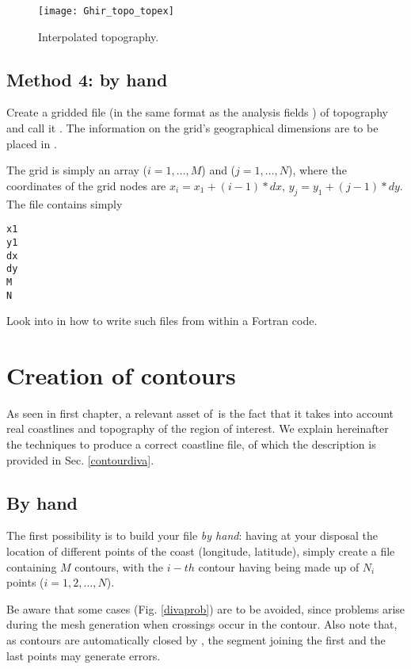 \begin{figure}[htpb]
\centering
\texttt{[image: Ghir\_topo\_topex]}
\caption{Interpolated topography.\label{fig:guirtopodiva}}
\end{figure}


\subsection{Method 4: by hand}

Create a gridded file (in the same format as the analysis fields ) of topography and call
it . The information on the grid's geographical dimensions are to be placed in .

The grid is simply an array ($i=1,\ldots,M$) and ($j=1,\ldots,N$), where the coordinates of the grid nodes are
$x_i=x_1+(i-1)*dx$, $y_j=y_1+(j-1)*dy$.  The file  contains simply
\begin{verbatim}
x1
y1
dx
dy
M
N
\end{verbatim}


Look into  in  how to write such files from within a Fortran code.


\section{Creation of contours\label{sec:contourgen}}

As seen in first chapter, a relevant asset of \diva\,is the fact that it takes into account real coastlines and topography of the region of interest. We explain hereinafter the techniques to produce a correct coastline file, of which the description is provided in Sec.  \ref{contourdiva}.


\subsection{By hand}

The first possibility is to build your file \textit{by hand}: having at your disposal the location of different points of the coast (longitude, latitude), simply create a file containing $M$ contours, with the $i-th$ contour having being made up of $N_{i}$ points ($i=1,2,\ldots, N$). 

Be aware that some cases (Fig. \ref{divaprob}) are to be avoided, since problems arise during the mesh generation when crossings occur in the contour. Also note that, as contours are automatically closed by \diva, the segment joining the first and the last points may generate errors. 


